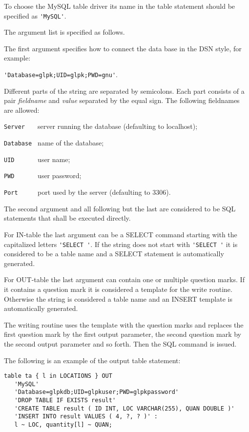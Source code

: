 \documentclass[11pt,draft]{article}
\begin{document}
\bigskip

To choose the MySQL table driver its name in the table statement should
be specified as \verb|'MySQL'|.

The argument list is specified as follows.

The first argument specifies how to connect the data base in the DSN
style, for example:

\verb|'Database=glpk;UID=glpk;PWD=gnu'|.

Different parts of the string are separated by semicolons. Each part
consists of a pair {\it fieldname} and {\it value} separated by the
equal sign. The following fieldnames are allowed:

\verb|Server   | server running the database (defaulting to localhost);

\verb|Database | name of the database;

\verb|UID      | user name;

\verb|PWD      | user password;

\verb|Port     | port used by the server (defaulting to 3306).

The second argument and all following but the last are considered to be
SQL statements that shall be executed directly.

For IN-table the last argument can be a SELECT command starting with
the capitalized letters \verb|'SELECT '|. If the string does not start
with \verb|'SELECT '| it is considered to be a table name and a SELECT
statement is automatically generated.

For OUT-table the last argument can contain one or multiple question
marks. If it contains a question mark it is considered a template for
the write routine. Otherwise the string is considered a table name and
an INSERT template is automatically generated.

The writing routine uses the template with the question marks and
replaces the first question mark by the first output parameter, the
second question mark by the second output parameter and so forth. Then
the SQL command is issued.

The following is an example of the output table statement:

\begin{small}
\begin{verbatim}
table ta { l in LOCATIONS } OUT
   'MySQL'
   'Database=glpkdb;UID=glpkuser;PWD=glpkpassword'
   'DROP TABLE IF EXISTS result'
   'CREATE TABLE result ( ID INT, LOC VARCHAR(255), QUAN DOUBLE )'
   'INSERT INTO result VALUES ( 4, ?, ? )' :
   l ~ LOC, quantity[l] ~ QUAN;
\end{verbatim}
\end{small}
\end{document}

